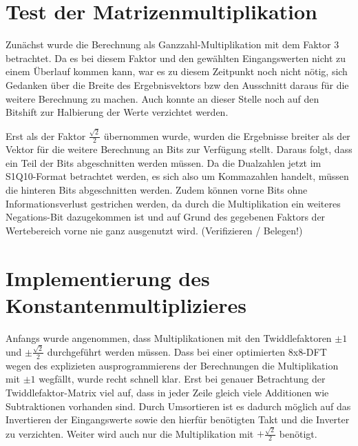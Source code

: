 \section{Test der Matrizenmultiplikation}
Zunächst wurde die Berechnung als Ganzzahl-Multiplikation mit dem Faktor 3 betrachtet. Da es bei diesem Faktor und den gewählten Eingangswerten nicht zu einem 
Überlauf kommen kann, war es zu diesem Zeitpunkt noch nicht nötig, sich Gedanken über die Breite des Ergebnisvektors bzw den Ausschnitt daraus für die weitere
Berechnung zu machen. Auch konnte an dieser Stelle noch auf den Bitshift zur Halbierung der Werte verzichtet werden.

Erst als der Faktor $\frac{\sqrt{2}}{2}$ übernommen wurde, wurden die Ergebnisse breiter als der Vektor für die weitere Berechnung an Bits zur Verfügung stellt.
Daraus folgt, dass ein Teil der Bits abgeschnitten werden müssen. Da die Dualzahlen jetzt im S1Q10-Format betrachtet werden, es sich also um Kommazahlen handelt,
müssen die hinteren Bits abgeschnitten werden. Zudem können vorne Bits ohne Informationsverlust gestrichen werden, da durch die Multiplikation ein weiteres 
Negations-Bit dazugekommen ist und auf Grund des gegebenen Faktors der Wertebereich vorne nie ganz ausgenutzt wird. (Verifizieren / Belegen!)


\section{Implementierung des Konstantenmultiplizieres}

Anfangs wurde angenommen, dass Multiplikationen mit den Twiddlefaktoren $\pm 1$ und $\pm\frac{\sqrt{2}}{2}$ durchgeführt werden müssen. 
Dass bei einer optimierten 8x8-DFT wegen des explizieten ausprogrammierens der Berechnungen die Multiplikation mit $\pm1$ wegfällt, wurde recht schnell klar.
Erst bei genauer Betrachtung der Twiddlefaktor-Matrix viel auf, dass in jeder Zeile gleich viele Additionen wie Subtraktionen vorhanden sind. Durch Umsortieren 
ist es dadurch möglich auf das Invertieren der Eingangswerte sowie den hierfür benötigten Takt und die Inverter zu verzichten. Weiter wird auch nur die Multiplikation
mit $+\frac{\sqrt{2}}{2}$ benötigt.


